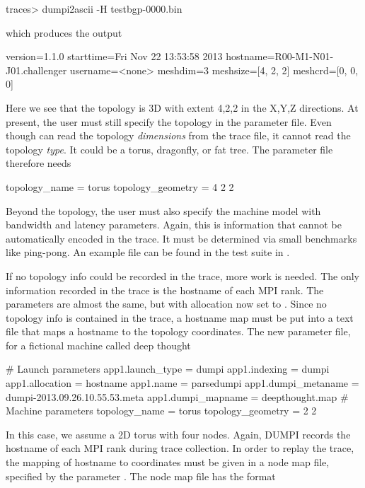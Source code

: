 \begin{ShellCmd}
traces> dumpi2ascii -H testbgp-0000.bin 
\end{ShellCmd}
which produces the output

\begin{ViFile}
version=1.1.0
starttime=Fri Nov 22 13:53:58 2013
hostname=R00-M1-N01-J01.challenger
username=<none>
meshdim=3
meshsize=[4, 2, 2]
meshcrd=[0, 0, 0]
\end{ViFile}
Here we see that the topology is 3D with extent 4,2,2 in the X,Y,Z directions.
At present, the user must still specify the topology in the parameter file.
Even though \sstmacro can read the topology \emph{dimensions} from the trace file,
it cannot read the topology \emph{type}.  It could be a torus, dragonfly, or fat tree.
The parameter file therefore needs

\begin{ViFile}
topology_name = torus
topology_geometry = 4 2 2
\end{ViFile}
Beyond the topology, the user must also specify the machine model with bandwidth and latency parameters.
Again, this is information that cannot be automatically encoded in the trace.
It must be determined via small benchmarks like ping-pong.
An example file can be found in the test suite in .

If no topology info could be recorded in the trace, more work is needed.
The only information recorded in the trace is the hostname of each MPI rank.
The parameters are almost the same, but with allocation now set to .
Since no topology info is contained in the trace, 
a hostname map must be put into a text file that maps a hostname to the topology coordinates.
The new parameter file, for a fictional machine called deep thought

\begin{ViFile}
# Launch parameters
app1.launch_type = dumpi
app1.indexing = dumpi
app1.allocation = hostname
app1.name = parsedumpi
app1.dumpi_metaname = dumpi-2013.09.26.10.55.53.meta
app1.dumpi_mapname = deepthought.map
# Machine parameters
topology_name = torus
topology_geometry = 2 2
\end{ViFile}


In this case, we assume a 2D torus with four nodes.
Again, DUMPI records the hostname of each MPI rank during trace collection.
In order to replay the trace, the mapping of hostname to coordinates must be given in a node map file,
specified by the parameter .
The node map file has the format

